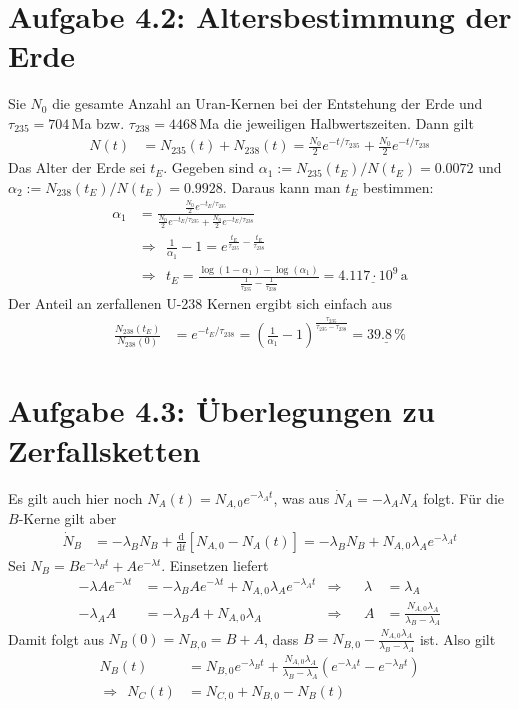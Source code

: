 \documentclass[a4paper,12pt]{article}
\newcommand{\kla}{}
\newcommand{\klam}{}
\newcommand{\tecxt}{}
\begin{document}
\section*{Aufgabe 4.2: Altersbestimmung der Erde}
Sie $N_0$ die gesamte Anzahl an Uran-Kernen bei der Entstehung der Erde und $\tau_{235}=704\,$Ma bzw. $\tau_{238}=4468\,$Ma die jeweiligen Halbwertszeiten. Dann gilt
\begin{align*}
N(t)&=N_{235}(t)+N_{238}(t)=\frac{N_0}{2}e^{-t/\tau_{235}}+\frac{N_0}{2}e^{-t/\tau_{238}}
\end{align*}
Das Alter der Erde sei $t_E$. Gegeben sind $\alpha_1:=N_{235}(t_E)/N(t_E)=0.0072$ und $\alpha_2:=N_{238}(t_E)/N(t_E)=0.9928$. Daraus kann man $t_E$ bestimmen:
\begin{align*}
\alpha_1&=\frac{\frac{N_0}{2}e^{-t_E/\tau_{235}}}{\frac{N_0}{2}e^{-t_E/\tau_{235}}+\frac{N_0}{2}e^{-t_E/\tau_{238}}}\\ 
&\Rightarrow\ \ \frac{1}{\alpha_1}-1=e^{\frac{t_E}{\tau_{235}}-\frac{t_E}{\tau_{238}}}\\
&\Rightarrow\ \ t_E=\frac{\log(1-\alpha_1)-\log(\alpha_1)}{\frac{1}{\tau_{235}}-\frac{1}{\tau_{238}}}=\underline{4.117\cdot 10^{9}\,\tecxt\text{a}}
\end{align*}
Der Anteil an zerfallenen U-238 Kernen ergibt sich einfach aus
\begin{align*}
\frac{N_{238}(t_E)}{N_{238}(0)}&=e^{-t_E/\tau_{238}}=\kla\left( {\frac{1}{\alpha_1}-1} \right)^{\frac{\tau_{235}}{\tau_{235}-\tau_{238}}}=\underline{39.8\,\%}
\end{align*}
\section*{Aufgabe 4.3: Überlegungen zu Zerfallsketten}
Es gilt auch hier noch $N_A(t)=N_{A,0}e^{-\lambda_At}$, was aus $\dot{N}_A=-\lambda_AN_A$ folgt. Für die $B$-Kerne gilt aber 
\begin{align*}
\dot{N}_B&=-\lambda_BN_B+\frac{\tecxt\text{d}}{\tecxt\text{d}t}\klam\left[ {N_{A,0}-N_A(t)} \right]=-\lambda_BN_B+N_{A,0}\lambda_Ae^{-\lambda_At}
\end{align*}
Sei $N_B=Be^{-\lambda_B t}+Ae^{-\lambda t}$. Einsetzen liefert
\begin{align*}
-\lambda Ae^{-\lambda t} &=-\lambda_BAe^{-\lambda t} + N_{A,0}\lambda_Ae^{-\lambda_At}&\Rightarrow &&\lambda&=\lambda_A\\
-\lambda_AA&=-\lambda_BA+N_{A,0}\lambda_A&\Rightarrow &&A&=\frac{N_{A,0}\lambda_A}{\lambda_B-\lambda_A}
\end{align*}
Damit folgt aus $N_B(0)=N_{B,0}=B+A$, dass $B=N_{B,0}-\frac{N_{A,0}\lambda_A}{\lambda_B-\lambda_A}$ ist. Also gilt
\begin{align*}
N_B(t)&=N_{B,0}e^{-\lambda_Bt}+\frac{N_{A,0}\lambda_A}{\lambda_B-\lambda_A}\kla\left( {e^{-\lambda_At}-e^{-\lambda_Bt}} \right)\\
\Rightarrow\ \ N_C(t)&=N_{C,0}+ N_{B,0}-N_B(t)
\end{align*}
\end{document}
